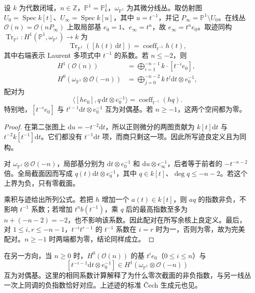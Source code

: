 \begin{proposition}[射影直线上的显式配对]\label{b3:prop:H-projective-line-duality}
	设 \(k\) 为代数闭域，\(n\in\mathbb Z\)，\(\mathbb P^1=\mathbb P^1_k\)，\(\omega_{\mathbb P^1}\) 为其微分线丛。取仿射图 \(U_0=\operatorname{Spec}k[t]\)、\(U_\infty=\operatorname{Spec}k[u]\)，其中 \(u=t^{-1}\)，并记 \(P_\infty=\mathbb P^1\setminus U_0\)。在线丛 \(\mathcal O(n)=\mathcal O(nP_\infty)\) 上取局部基 \(e_0=1\)、\(e_\infty=t^n\)，故 \(e_\infty=t^ne_0\)。取迹同构 \(\operatorname{Tr}_{\mathbb P^1}:H^1(\mathbb P^1,\omega_{\mathbb P^1})\to k\) 为
	\[
		\operatorname{Tr}_{\mathbb P^1}([h(t)\,\mathrm{d}t])
		=\operatorname{coeff}_{t^{-1}}h(t),
	\]
	其中右端表示 Laurent 多项式中 \(t^{-1}\) 的系数。若 \(n\le-2\)，则
	\[
		\begin{aligned}
			H^1(\mathcal O(n))&=\bigoplus_{i=1}^{-n-1}k\cdot[t^{-i}e_0],\\
			H^0(\omega_{\mathbb P^1}\otimes\mathcal O(-n))
			&=\bigoplus_{j=0}^{-n-2}k\,t^j\mathrm{d}t\otimes e_0^{-1},
		\end{aligned}
	\]
	配对为
	\[
		\langle[he_0],q\,\mathrm{d}t\otimes e_0^{-1}\rangle
		=\operatorname{coeff}_{t^{-1}}(hq).
	\]
	特别地，\([t^{-i}e_0]\) 与 \(t^{i-1}\mathrm{d}t\otimes e_0^{-1}\) 互为对偶基。若 \(n\ge-1\)，这两个空间都为零。
\end{proposition}
\begin{proof}
	在第二张图上 \(\mathrm{d}u=-t^{-2}\mathrm{d}t\)，所以正则微分的两图贡献为 \(k[t]\mathrm{d}t\) 与 \(t^{-2}k[t^{-1}]\mathrm{d}t\)。它们都没有 \(t^{-1}\mathrm{d}t\) 项，而商只剩这一项。因此所写迹良定义且为同构。

	对 \(\omega_{\mathbb P^1}\otimes\mathcal O(-n)\)，局部基分别为 \(\mathrm{d}t\otimes e_0^{-1}\) 和 \(\mathrm{d}u\otimes e_\infty^{-1}\)，后者等于前者的 \(-t^{-n-2}\) 倍。全局截面因而写成 \(q(t)\mathrm{d}t\otimes e_0^{-1}\)，其中 \(q\in k[t]\)、\(\deg q\le-n-2\)。若这个上界为负，只有零截面。

	乘积与迹给出所列公式。若把 \(h\) 增加一个 \(a(t)\in k[t]\)，则 \(a q\) 的指数非负，不影响 \(t^{-1}\) 系数；若增加 \(t^n b(t^{-1})\)，乘 \(q\) 后的最高指数至多为 \(n+(-n-2)=-2\)，也不影响该系数。因此配对在所写余核上良定义。最后，对 \(1\le i,r\le-n-1\)，\(t^{-i}t^{r-1}\) 的 \(t^{-1}\) 系数在 \(i=r\) 时为一，否则为零，故为完美配对。\(n\ge-1\) 时两端都为零，结论同样成立。
\end{proof}

在另一方向，当 \(n\ge0\) 时，\(H^0(\mathcal O(n))\) 的基 \(t^ie_0\)（\(0\le i\le n\)）与
\[
	[t^{-i-1}\mathrm{d}t\otimes e_0^{-1}]
	\in H^1(\omega_{\mathbb P^1}\otimes\mathcal O(-n))
\]
互为对偶基。这里的相同系数计算解释了为什么零次截面的非负指数，与另一线丛一次上同调的负指数恰好对应。上述迹的标准 Čech 生成元也见\cite[Chapter III, Remark 7.1.1, pp. 240--241]{Hartshorne1977}。

